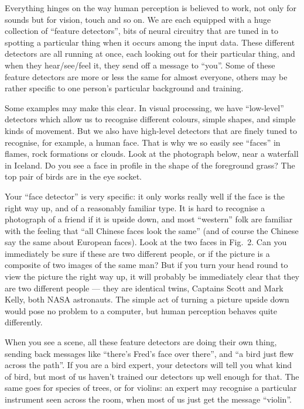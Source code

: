   Everything hinges on the way human perception is believed to work, not only 
  for sounds but for vision, touch and so on. We are each equipped with a huge 
  collection of ``feature detectors'', bits of neural circuitry that are tuned 
  in to spotting a particular thing when it occurs among the input data. These 
  different detectors are all running at once, each looking out for their 
  particular thing, and when they hear/see/feel it, they send off a message to 
  ``you''. Some of these feature detectors are more or less the same for almost 
  everyone, others may be rather specific to one person's particular background 
  and training. 

  Some examples may make this clear. In visual processing, we have 
  ``low-level'' detectors which allow us to recognise different colours, simple 
  shapes, and simple kinds of movement. But we also have high-level detectors 
  that are finely tuned to recognise, for example, a human face. That is why we 
  so easily see ``faces'' in flames, rock formations or clouds. Look at the 
  photograph below, near a waterfall in Iceland. Do you see a face in profile 
  in the shape of the foreground grass? The top pair of birds are in the eye 
  socket. 


  Your ``face detector'' is very specific: it only works really well if the 
  face is the right way up, and of a reasonably familiar type. It is hard to 
  recognise a photograph of a friend if it is upside down, and most ``western'' 
  folk are familiar with the feeling that ``all Chinese faces look the same'' 
  (and of course the Chinese say the same about European faces). Look at the 
  two faces in Fig.\ 2. Can you immediately be sure if these are two different 
  people, or if the picture is a composite of two images of the same man? But 
  if you turn your head round to view the picture the right way up, it will 
  probably be immediately clear that they are two different people --- they are 
  identical twins, Captains Scott and Mark Kelly, both NASA astronauts. The 
  simple act of turning a picture upside down would pose no problem to a 
  computer, but human perception behaves quite differently. 

  When you see a scene, all these feature detectors are doing their own thing, 
  sending back messages like ``there's Fred's face over there'', and ``a bird 
  just flew across the path''. If you are a bird expert, your detectors will 
  tell you what kind of bird, but most of us haven't trained our detectors up 
  well enough for that. The same goes for species of trees, or for violins: an 
  expert may recognise a particular instrument seen across the room, when most 
  of us just get the message ``violin''. 


